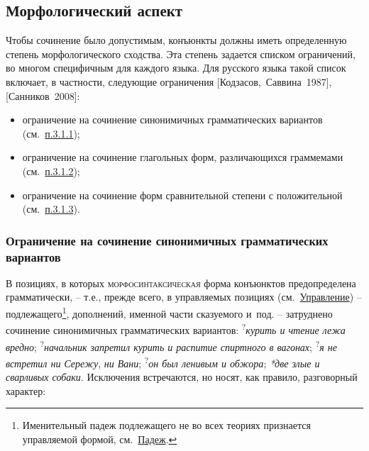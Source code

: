 \hypertarget{ux43cux43eux440ux444ux43eux43bux43eux433ux438ux447ux435ux441ux43aux438ux439-ux430ux441ux43fux435ux43aux442}{%
\subsection{Морфологический
аспект}\label{ux43cux43eux440ux444ux43eux43bux43eux433ux438ux447ux435ux441ux43aux438ux439-ux430ux441ux43fux435ux43aux442}}

Чтобы сочинение было допустимым, конъюнкты должны иметь определенную
степень морфологического сходства. Эта степень задается списком
ограничений, во многом специфичным для каждого языка. Для русского языка
такой список включает, в частности, следующие ограничения
{[}Кодзасов,~Саввина~1987{]}, {[}Санников~2008{]}:

\begin{itemize}
\item
  ограничение на сочинение синонимичных грамматических вариантов
  (см.~\underline{п.3.1.1});
\item
  ограничение на сочинение глагольных форм, различающихся граммемами
  (см.~\underline{п.3.1.2});
\item
  ограничение на сочинение форм сравнительной степени с положительной
  (см.~\underline{п.3.1.3}).
\end{itemize}

\hypertarget{ux43eux433ux440ux430ux43dux438ux447ux435ux43dux438ux435-ux43dux430-ux441ux43eux447ux438ux43dux435ux43dux438ux435-ux441ux438ux43dux43eux43dux438ux43cux438ux447ux43dux44bux445-ux433ux440ux430ux43cux43cux430ux442ux438ux447ux435ux441ux43aux438ux445-ux432ux430ux440ux438ux430ux43dux442ux43eux432}{%
\subsubsection{Ограничение на сочинение синонимичных грамматических
вариантов}\label{ux43eux433ux440ux430ux43dux438ux447ux435ux43dux438ux435-ux43dux430-ux441ux43eux447ux438ux43dux435ux43dux438ux435-ux441ux438ux43dux43eux43dux438ux43cux438ux447ux43dux44bux445-ux433ux440ux430ux43cux43cux430ux442ux438ux447ux435ux441ux43aux438ux445-ux432ux430ux440ux438ux430ux43dux442ux43eux432}}

В позициях, в которых \textsc{морфосинтаксическая} форма конъюнктов
предопределена грамматически, -- т.е., прежде всего, в управляемых
позициях (см.~\underline{Управление}) -- подлежащего\footnote{Именительный
  падеж подлежащего не во всех теориях признается управляемой формой,
  см.~\underline{Падеж}.}, дополнений, именной части сказуемого и~под.
-- затруднено сочинение синонимичных грамматических вариантов:
\textsuperscript{?}\emph{курить и чтение лежа вредно};
\textsuperscript{?}\emph{начальник запретил курить и распитие спиртного
в вагонах}; \textsuperscript{?}\emph{я не встретил ни Сережу}, \emph{ни
Вани}; \textsuperscript{?}\emph{он был ленивым и обжора}; \emph{*две
злые и сварливых собаки}. Исключения встречаются, но носят, как правило,
разговорный характер:

